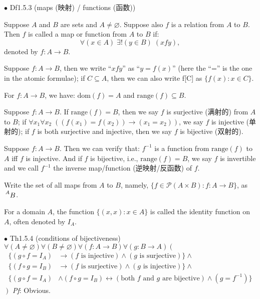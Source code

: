 \documentclass{article}
\begin{document}
\begin{Df}{$\bullet$ Df1.5.3 (maps (映射) / functions (函数))}
    \begin{compactenum}
        \item Suppose $A$ and $B$ are sets and $A\neq \varnothing$. Suppose also $f$ is a relation from $A$ to $B$. Then $f$ is called a map or function from $A$ to $B$ if: $$\forall (x\in A)\; \exists! (y\in B)\; (xfy),$$ denoted by $f:A\rightarrow B$.
        \item Suppose $f:A\rightarrow B$, then we write ``$xfy$'' as ``$y = f(x)$'' (here the ``='' is the one in the atomic formulae); if $C\subseteq A$, then we can also write f[C] as $\{f(x):x\in C\}$.
        \item \textcolor{Th}{For $f:A\rightarrow B$, we have: $\text{dom}(f) = A$ and $\text{range}(f)\subseteq B$.}
        \item Suppose $f:A\rightarrow B$. If $\text{range}(f) = B$, then we say $f$ is surjective (满射的) from $A$ to $B$; if $\forall x_1 \forall x_2\; \left((f(x_1) = f(x_2))\rightarrow (x_1 = x_2)\right)$, we say $f$ is injective (单射的); if $f$ is both surjective and injective, then we say $f$ is bijective (双射的).
        \item \textcolor{Th}{Suppose $f: A\rightarrow B$. Then we can verify that: $f^{-1}$ is a function from $\text{range}(f)$ to $A$ iff $f$ is injective.} And if $f$ is bijective, i.e., $\text{range}(f) = B$, we say $f$ is invertible and we call $f^{-1}$ the inverse map/function (逆映射/反函数) of $f$.
        \item \textcolor{Th}{Write the set of all maps from $A$ to $B$, namely, $\{f\in \mathcal{P}(A\times B): f:A\rightarrow B\}$, as $\sideset{^A}{} {\mathop{B}}$.}
        \item For a domain $A$, the function $\{(x,x): x\in A\}$ is called the identity function on $A$, often denoted by $I_A$.
    \end{compactenum}
\end{Df}

\begin{Th}{$\bullet$ Th1.5.4 (conditions of bijectiveness)}
    \textcolor{Th}{$\forall (A\neq\varnothing) \forall (B\neq\varnothing) \forall (f:A\rightarrow B) \forall (g:B\rightarrow A)\left(\right.$
    $$
    \begin{aligned}
        \{(g\circ f = I_A)&\rightarrow (f\text{ is injective})\land (g\text{ is surjective})\}\land\\
        \{(f\circ g = I_B)&\rightarrow (f\text{ is surjective})\land (g\text{ is injective})\}\land\\
        \{(g\circ f = I_A)&\land (f\circ g = I_B)\leftrightarrow (\text{both }f \text{ and } g\text{ are bijective})\land (g = f^{-1})\}
    \end{aligned}
    $$
    $\left.\right)$}
    \tcblower
    \textit{Pf}: Obvious.
\end{Th}
\end{document}
